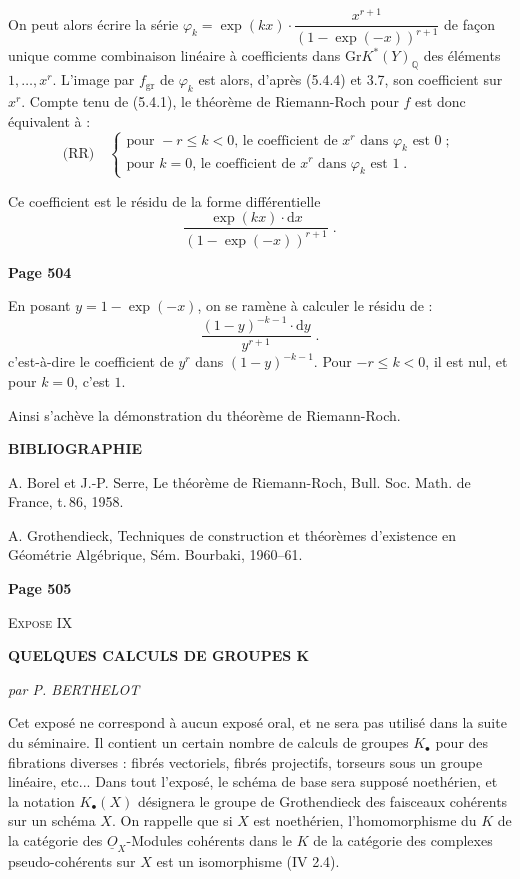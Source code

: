 On peut alors \'ecrire la s\'erie $\varphi_k = \exp(kx) \cdot \dfrac{x^{r+1}}{(1-\exp(-x))^{r+1}}$ de fa\c{c}on unique comme combinaison lin\'eaire \`a coefficients dans $\mathrm{Gr} K^*(Y)_{\mathbb{Q}}$ des \'el\'ements $1, \ldots, x^r$. L'image par $f_{\mathrm{gr}}$ de $\varphi_k$ est alors, d'apr\`es (5.4.4) et 3.7, son coefficient sur $x^r$. Compte tenu de (5.4.1), le th\'eor\`eme de Riemann-Roch pour $f$ est donc \'equivalent \`a :
\[
\text{(RR)} \quad
\begin{cases}
\text{pour } -r \leq k < 0 \text{, le coefficient de } x^r \text{ dans } \varphi_k \text{ est } 0\;;\\
\text{pour } k = 0 \text{, le coefficient de } x^r \text{ dans } \varphi_k \text{ est } 1\;.
\end{cases}
\]

Ce coefficient est le r\'esidu de la forme diff\'erentielle
\[
\frac{\exp(kx) \cdot \mathrm{d}x}{(1-\exp(-x))^{r+1}}\;.
\]

\newpage
\noindent\textbf{Page 504}

En posant $y = 1 - \exp(-x)$, on se ram\`ene \`a calculer le r\'esidu de :
\[
\frac{(1-y)^{-k-1} \cdot \mathrm{d}y}{y^{r+1}}\;.
\]
c'est-\`a-dire le coefficient de $y^r$ dans $(1-y)^{-k-1}$. Pour $-r \leq k < 0$, il est nul, et pour $k = 0$, c'est $1$.

Ainsi s'ach\`eve la d\'emonstration du th\'eor\`eme de Riemann-Roch.

\vspace{1cm}
\noindent\textbf{BIBLIOGRAPHIE}

\smallskip
\noindent [1]\quad A. Borel et J.-P. Serre, Le th\'eor\`eme de Riemann-Roch, Bull. Soc. Math. de France, t.\,86, 1958.

\smallskip
\noindent [2]\quad A. Grothendieck, Techniques de construction et th\'eor\`emes d'existence en G\'eom\'etrie Alg\'ebrique, S\'em. Bourbaki, 1960--61.

\newpage
\noindent\textbf{Page 505}

\begin{center}
\textsc{Expose IX}

\medskip
\textbf{QUELQUES CALCULS DE GROUPES K}

\medskip
\textit{par P. BERTHELOT}
\end{center}

\bigskip
Cet expos\'e ne correspond \`a aucun expos\'e oral, et ne sera pas utilis\'e dans la suite du s\'eminaire. Il contient un certain nombre de calculs de groupes $K_\bullet$ pour des fibrations diverses : fibr\'es vectoriels, fibr\'es projectifs, torseurs sous un groupe lin\'eaire, etc... Dans tout l'expos\'e, le sch\'ema de base sera suppos\'e noeth\'erien, et la notation $K_\bullet(X)$ d\'esignera le groupe de Grothendieck des faisceaux coh\'erents sur un sch\'ema $X$. On rappelle que si $X$ est noeth\'erien, l'homomorphisme du $K$ de la cat\'egorie des $\underline{O}_X$-Modules coh\'erents dans le $K$ de la cat\'egorie des complexes pseudo-coh\'erents sur $X$ est un isomorphisme (IV 2.4).

